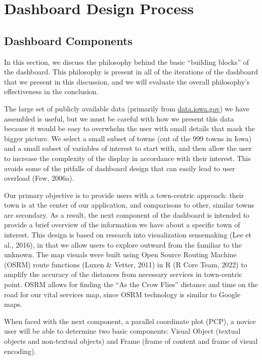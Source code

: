 \documentclass[print]{nuthesis}
\begin{document}
\hypertarget{dashboard-design-process}{%
\section{Dashboard Design Process}\label{dashboard-design-process}}

\hypertarget{dashboard-components}{%
\subsection{Dashboard Components}\label{dashboard-components}}

In this section, we discuss the philosophy behind the basic ``building blocks'' of the dashboard. This philosophy is present in all of the iterations of the dashboard that we present in this discussion, and we will evaluate the overall philosophy's effectiveness in the conclusion.

The large set of publicly available data (primarily from \url{data.iowa.gov}) we have assembled is useful, but we must be careful with how we present this data because it would be easy to overwhelm the user with small details that mask the bigger picture. We select a small subset of towns (out of the 999 towns in Iowa) and a small subset of variables of interest to start with, and then allow the user to increase the complexity of the display in accordance with their interest. This avoids some of the pitfalls of dashboard design that can easily lead to user overload (Few, 2006a).

Our primary objective is to provide users with a town-centric approach: their town is at the center of our application, and comparisons to other, similar towns are secondary. As a result, the next component of the dashboard is intended to provide a brief overview of the information we have about a specific town of interest. This design is based on research into visualization sensemaking (Lee et al., 2016), in that we allow users to explore outward from the familiar to the unknown. The map visuals were built using Open Source Routing Machine (OSRM) route functions (Luxen \& Vetter, 2011) in R (R Core Team, 2022) to amplify the accuracy of the distances from necessary services in town-centric point. OSRM allows for finding the ``As the Crow Flies'' distance and time on the road for our vital services map, since OSRM technology is similar to Google maps.

When faced with the next component, a parallel coordinate plot (PCP), a novice user will be able to determine two basic components: Visual Object (textual objects and non-textual objects) and Frame (frame of content and frame of visual encoding).
\end{document}

